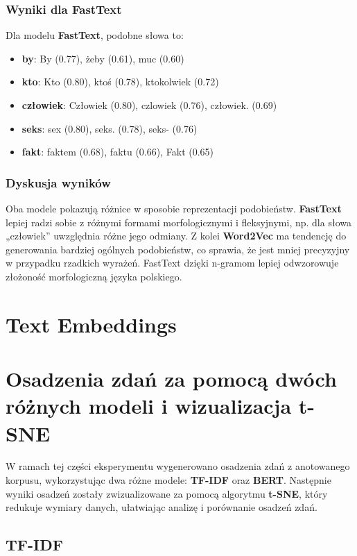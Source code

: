 \documentclass[12pt]{article}
\begin{document}
\subsubsection{Wyniki dla FastText}
Dla modelu \textbf{FastText}, podobne słowa to:
\begin{itemize}
    \item \textbf{by}: By (0.77), żeby (0.61), muc (0.60)
    \item \textbf{kto}: Kto (0.80), ktoś (0.78), ktokolwiek (0.72)
    \item \textbf{człowiek}: Człowiek (0.80), czlowiek (0.76), człowiek. (0.69)
    \item \textbf{seks}: sex (0.80), seks. (0.78), seks- (0.76)
    \item \textbf{fakt}: faktem (0.68), faktu (0.66), Fakt (0.65)
\end{itemize}

\subsubsection{Dyskusja wyników}
Oba modele pokazują różnice w sposobie reprezentacji podobieństw. \textbf{FastText} lepiej radzi sobie z różnymi formami morfologicznymi i fleksyjnymi, np. dla słowa „człowiek” uwzględnia różne jego odmiany. Z kolei \textbf{Word2Vec} ma tendencję do generowania bardziej ogólnych podobieństw, co sprawia, że jest mniej precyzyjny w przypadku rzadkich wyrażeń. FastText dzięki n-gramom lepiej odwzorowuje złożoność morfologiczną języka polskiego.

\section{Text Embeddings}

\section{Osadzenia zdań za pomocą dwóch różnych modeli i wizualizacja t-SNE}

W ramach tej części eksperymentu wygenerowano osadzenia zdań z anotowanego korpusu, wykorzystując dwa różne modele: \textbf{TF-IDF} oraz \textbf{BERT}. Następnie wyniki osadzeń zostały zwizualizowane za pomocą algorytmu \textbf{t-SNE}, który redukuje wymiary danych, ułatwiając analizę i porównanie osadzeń zdań.

\subsection{TF-IDF}
\end{document}
